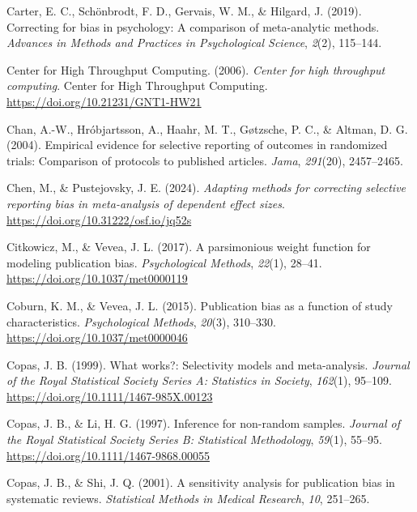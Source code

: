 \documentclass[
  american,
  man, donotrepeattitle,floatsintext]{apa7}
\newlength{\cslhangindent}
\newenvironment{CSLReferences}[2] %
 {\begin{list}{}{%
  \setlength{\itemindent}{0pt}
  \setlength{\leftmargin}{0pt}
  \setlength{\parsep}{0pt}
  \ifodd #1
   \setlength{\leftmargin}{\cslhangindent}
   \setlength{\itemindent}{-1\cslhangindent}
  \fi
  \setlength{\itemsep}{#2\baselineskip}}}
 {\end{list}}
\begin{document}
\begin{CSLReferences}{1}{0}
Carter, E. C., Schönbrodt, F. D., Gervais, W. M., \& Hilgard, J. (2019). Correcting for bias in psychology: A comparison of meta-analytic methods. \emph{Advances in Methods and Practices in Psychological Science}, \emph{2}(2), 115--144.

Center for High Throughput Computing. (2006). \emph{Center for high throughput computing}. Center for High Throughput Computing. \url{https://doi.org/10.21231/GNT1-HW21}

Chan, A.-W., Hróbjartsson, A., Haahr, M. T., Gøtzsche, P. C., \& Altman, D. G. (2004). Empirical evidence for selective reporting of outcomes in randomized trials: Comparison of protocols to published articles. \emph{Jama}, \emph{291}(20), 2457--2465.

Chen, M., \& Pustejovsky, J. E. (2024). \emph{Adapting methods for correcting selective reporting bias in meta-analysis of dependent effect sizes}. \url{https://doi.org/10.31222/osf.io/jq52s}

Citkowicz, M., \& Vevea, J. L. (2017). {A parsimonious weight function for modeling publication bias}. \emph{Psychological Methods}, \emph{22}(1), 28--41. \url{https://doi.org/10.1037/met0000119}

Coburn, K. M., \& Vevea, J. L. (2015). {Publication bias as a function of study characteristics}. \emph{Psychological Methods}, \emph{20}(3), 310--330. \url{https://doi.org/10.1037/met0000046}

Copas, J. B. (1999). What works?: {Selectivity} models and meta-analysis. \emph{Journal of the Royal Statistical Society Series A: Statistics in Society}, \emph{162}(1), 95--109. \url{https://doi.org/10.1111/1467-985X.00123}

Copas, J. B., \& Li, H. G. (1997). Inference for non-random samples. \emph{Journal of the Royal Statistical Society Series B: Statistical Methodology}, \emph{59}(1), 55--95. \url{https://doi.org/10.1111/1467-9868.00055}

Copas, J. B., \& Shi, J. Q. (2001). {A sensitivity analysis for publication bias in systematic reviews.} \emph{Statistical Methods in Medical Research}, \emph{10}, 251--265.


\end{CSLReferences}
\end{document}
